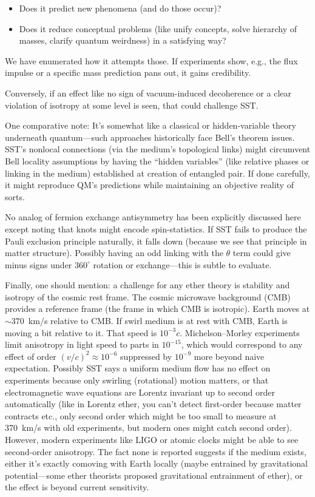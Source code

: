 \documentclass[10pt,reprint,aps,onecolumn,nofootinbib]{revtex4-2}
\begin{document}
\begin{itemize}
  \item Does it predict new phenomena (and do those occur)?
  \item Does it reduce conceptual problems (like unify concepts, solve hierarchy of masses, clarify quantum weirdness) in a satisfying way?
\end{itemize}

We have enumerated how it attempts those. If experiments show, e.g., the flux impulse or a specific mass prediction pans out, it gains credibility.

Conversely, if an effect like no sign of vacuum-induced decoherence or a clear violation of isotropy at some level is seen, that could challenge SST.

One comparative note: It's somewhat like a classical or hidden-variable theory underneath quantum---such approaches historically face Bell's theorem issues. SST’s nonlocal connections (via the medium’s topological links) might circumvent Bell locality assumptions by having the ``hidden variables'' (like relative phases or linking in the medium) established at creation of entangled pair. If done carefully, it might reproduce QM’s predictions while maintaining an objective reality of sorts.

No analog of fermion exchange antisymmetry has been explicitly discussed here except noting that knots might encode spin-statistics. If SST fails to produce the Pauli exclusion principle naturally, it falls down (because we see that principle in matter structure). Possibly having an odd linking with the $\theta$ term could give minus signs under $360^\circ$ rotation or exchange---this is subtle to evaluate.

Finally, one should mention: a challenge for any ether theory is stability and isotropy of the cosmic rest frame. The cosmic microwave background (CMB) provides a reference frame (the frame in which CMB is isotropic). Earth moves at $\sim 370$~km/s relative to CMB. If swirl medium is at rest with CMB, Earth is moving a bit relative to it. That speed is $10^{-3}c$. Michelson--Morley experiments limit anisotropy in light speed to parts in $10^{-15}$, which would correspond to any effect of order $(v/c)^2 \approx 10^{-6}$ suppressed by $10^{-9}$ more beyond naive expectation. Possibly SST says a uniform medium flow has no effect on experiments because only swirling (rotational) motion matters, or that electromagnetic wave equations are Lorentz invariant up to second order automatically (like in Lorentz ether, you can’t detect first-order because matter contracts etc., only second order which might be too small to measure at 370~km/s with old experiments, but modern ones might catch second order). However, modern experiments like LIGO or atomic clocks might be able to see second-order anisotropy. The fact none is reported suggests if the medium exists, either it's exactly comoving with Earth locally (maybe entrained by gravitational potential---some ether theorists proposed gravitational entrainment of ether), or the effect is beyond current sensitivity.
\end{document}
